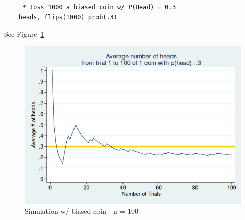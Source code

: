 \documentclass[11pt]{article}
\begin{document}
	\begin{verbatim}
	 * toss 1000 a biased coin w/ P(Head) = 0.3
	heads, flips(1000) prob(.3)	 
	\end{verbatim}

See Figure~\ref{f5}\\

\begin{figure}[htp]
\centering
\includegraphics[scale=0.50]{coin_sim_100_biased.png}
\caption{Simulation w/ biased coin - n = 100}
\label{f5}
\end{figure}
\end{document}
